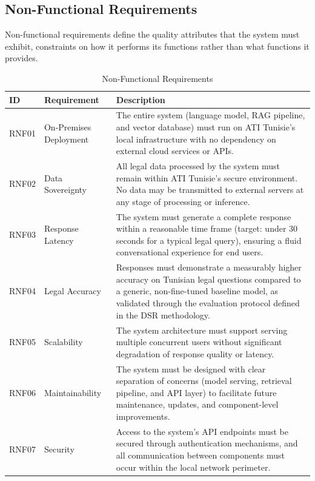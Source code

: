 \subsection{Non-Functional Requirements}

Non-functional requirements define the quality attributes that the system
must exhibit, constraints on how it performs its functions rather than
what functions it provides.

\begin{table}[H]
\centering
\caption{Non-Functional Requirements}
\label{tab:non-functional-requirements}
\renewcommand{\arraystretch}{1.5}
\begin{tabular}{|p{1.2cm}|p{4cm}|p{8.5cm}|}
\hline
\textbf{ID} & \textbf{Requirement} & \textbf{Description} \\
\hline
RNF01 & On-Premises Deployment &
The entire system (language model, \ac{RAG} pipeline, and vector
database) must run on \ac{ATI} Tunisie's local infrastructure with
no dependency on external cloud services or \ac{API}s. \\
\hline
RNF02 & Data Sovereignty &
All legal data processed by the system must remain within \ac{ATI}
Tunisie's secure environment. No data may be transmitted to external
servers at any stage of processing or inference. \\
\hline
RNF03 & Response Latency &
The system must generate a complete response within a reasonable
time frame (target: under 30 seconds for a typical legal query),
ensuring a fluid conversational experience for end users. \\
\hline
RNF04 & Legal Accuracy &
Responses must demonstrate a measurably higher accuracy on Tunisian
legal questions compared to a generic, non-fine-tuned baseline model,
as validated through the evaluation protocol defined in the \ac{DSR}
methodology. \\
\hline
RNF05 & Scalability &
The system architecture must support serving multiple concurrent
users without significant degradation of response quality or latency. \\
\hline
RNF06 & Maintainability &
The system must be designed with clear separation of concerns
(model serving, retrieval pipeline, and \ac{API} layer) to facilitate
future maintenance, updates, and component-level improvements. \\
\hline
RNF07 & Security &
Access to the system's \ac{API} endpoints must be secured through
authentication mechanisms, and all communication between components
must occur within the local network perimeter. \\
\hline
\end{tabular}
\end{table}

